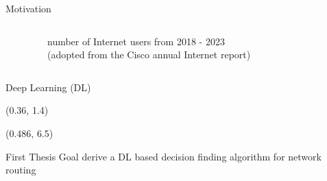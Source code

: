 \documentclass[english,aspectratio=169,dvipsnames]{beamer}
\begin{document}
\begin{frame}{Motivation}
\begin{columns}
\begin{textblock}{6.5}
\begin{itemize}
                \end{itemize}
            \end{textblock}
         {
            \vspace{0cm}
            \begin{figure}[ht]
    	       \begin{adjustwidth}{0cm}{0cm}
        		\centering
        		
        		\vspace{0cm}
                \captionsetup{justification=centering}
        		\caption*{
                        number of Internet users from 2018 - 2023 \\ (adopted from the Cisco annual Internet report) 
                        }
    	       \end{adjustwidth}
            \end{figure}
        }
    \end{columns}
\end{frame}


\begin{frame}{Deep Learning (DL)}
    
    \begin{textblock}{5}(0.36, 1.4)
        
    \end{textblock}

    \begin{textblock}{14.96}(0.486, 6.5)
         {
          \begin{exampleblock}{\centering First Thesis Goal}
            \centering derive a DL based decision finding algorithm for network routing
          \end{exampleblock}
        }
    \end{textblock}
    
    

\end{frame}
\end{document}
